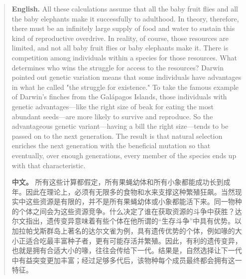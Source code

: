 \begin{quote}
\noindent\textbf{English.} All these calculations assume that all the baby fruit flies and all the baby elephants make it successfully to adulthood. In theory, therefore, there must be an infinitely large supply of food and water to sustain this kind of reproductive overdrive. In reality, of course, those resources are limited, and not all baby fruit flies or baby elephants make it. There is competition among individuals within a species for those resources. What determines who wins the struggle for access to the resources? Darwin pointed out genetic variation means that some individuals have advantages in what he called "the struggle for existence." To take the famous example of Darwin's finches from the Galápagos Islands, those individuals with genetic advantages---like the right size of beak for eating the most abundant seeds---are more likely to survive and reproduce. So the advantageous genetic variant---having a bill the right size---tends to be passed on to the next generation. The result is that natural selection enriches the next generation with the beneficial mutation so that eventually, over enough generations, every member of the species ends up with that characteristic.

\smallskip
\noindent\textbf{中文。} 所有这些计算都假定，所有果蝇幼体和所有小象都能成功长到成年。因此在理论上，必须有无限多的食物和水来支撑这种繁殖狂飙。当然现实中这些资源是有限的，并不是所有果蝇幼体或小象都能活下来。同一物种的个体之间会为这些资源竞争。什么决定了谁在获取资源的斗争中获胜？达尔文指出，遗传变异意味着有些个体在他所谓的“生存斗争”中具有优势。以加拉帕戈斯群岛上著名的达尔文雀为例，具有遗传优势的个体，例如喙的大小正适合吃最丰富种子者，更有可能存活并繁殖。因此，有利的遗传变异，也就是拥有合适大小的喙，往往会传给下一代。结果是，自然选择让下一代中有益突变更加丰富；经过足够多代后，该物种每个成员最终都会拥有这一特征。
\end{quote}

